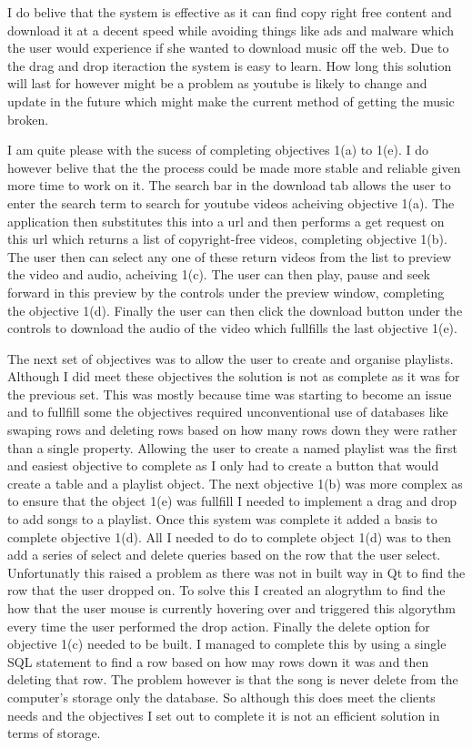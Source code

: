 \documentclass{article}
\begin{document}
I do belive that the system is effective as it can find copy right free content and download it at a decent
speed while avoiding things like ads and malware which the user would experience if she wanted to download
music off the web. Due to the drag and drop iteraction the system is easy to learn. How long this solution
will last for however might be a problem as youtube is likely to change and update in the future which
might make the current method of getting the music broken.

I am quite please with the sucess of completing objectives 1(a) to 1(e). I do however belive that the
the process could be made more stable and reliable given more time to work on it. The search bar
in the download tab allows the user to enter the search term to search for youtube videos acheiving
objective 1(a). The application then substitutes this into a url and then performs a get request
on this url which returns a list of copyright-free videos, completing objective 1(b). The user then
can select any one of these return videos from the list to preview the video and audio, acheiving 1(c).
The user can then play, pause and seek forward in this preview by the controls under the preview window,
completing the objective 1(d). Finally the user can then click the download button under the controls to
download the audio of the video which fullfills the last objective 1(e).

The next set of objectives was to allow the user to create and organise playlists. Although I did meet these
objectives the solution is not as complete as it was for the previous set. This was mostly because time was
starting to become an issue and to fullfill some the objectives required unconventional use of databases
like swaping rows and deleting rows based on how many rows down they were rather than a  single property.
Allowing the user to create a named playlist was the first and easiest objective to complete as I only had
to create a button that would create a table and a playlist object. The next objective 1(b) was more complex
as to ensure that the object 1(e) was fullfill I needed to implement a drag and drop to add songs to a
playlist. Once this system was complete it added a basis to complete objective 1(d). All I needed to do
to complete object 1(d) was to then add a series of select and delete queries based on the row that the
user select. Unfortunatly this raised a problem as there was not in built way in Qt to find the row
that the user dropped on. To solve this I created an alogrythm to find the how that the user mouse is
currently hovering over and triggered this algorythm every time the user performed the drop action.
Finally the delete option for objective 1(c) needed to be built. I managed to complete this by using a
single SQL statement to find a row based on how may rows down it was and then deleting that row. The
problem however is that the song is never delete from the computer's storage only the database.
So although this does meet the clients needs and the objectives I set out to complete it is not
an efficient solution in terms of storage.
\end{document}
